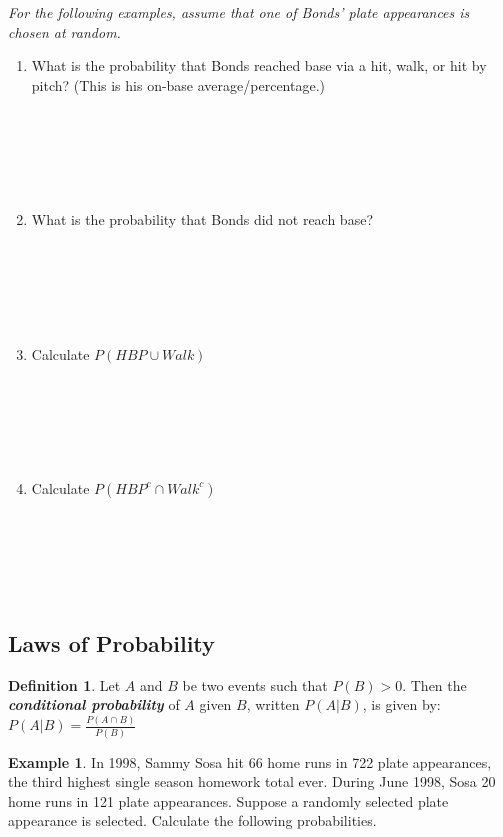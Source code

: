 \documentclass[
  11pt,
]{book}
\theoremstyle{definition}
\newtheorem{definition}{Definition}[chapter]
\theoremstyle{definition}
\newtheorem{example}{Example}[chapter]
\theoremstyle{definition}
\theoremstyle{definition}
\theoremstyle{remark}
\begin{document}
\emph{For the following examples, assume that one of Bonds' plate appearances is chosen at random.}\\

\begin{enumerate}
\def\labelenumi{(\alph{enumi})}
\setcounter{enumi}{2}
\item
  What is the probability that Bonds reached base via a hit, walk, or hit by pitch? (This is his on-base average/percentage.)\\
  \strut \\
  \strut \\
  \strut \\
  \vfill
\item
  What is the probability that Bonds did not reach base?\\
  \strut \\
  \strut \\
  \strut \\
  \vfill
\item
  Calculate \(P\left(HBP \cup Walk\right)\)\\
  \strut \\
  \strut \\
  \strut \\
  \vfill
\item
  Calculate \(P\left(HBP^c \cap Walk^c\right)\)\\
  \strut \\
  \strut \\
  \strut \\
  \vfill
\end{enumerate}

\newpage

\hypertarget{laws-of-probability}{%
\subsection{Laws of Probability}\label{laws-of-probability}}

\begin{definition}
Let \(A\) and \(B\) be two events such that \(P(B)>0\). Then the \textbf{\emph{conditional probability}} of \(A\) given \(B\), written \(P(A|B)\), is given by:
\(P(A|B) = \frac{P(A \cap B)}{P(B)}\)
\end{definition}

\begin{example}
In 1998, Sammy Sosa hit 66 home runs in 722 plate appearances, the third highest single season homework total ever. During June 1998, Sosa 20 home runs in 121 plate appearances. Suppose a randomly selected plate appearance is selected. Calculate the following probabilities.
\end{example}
\end{document}
